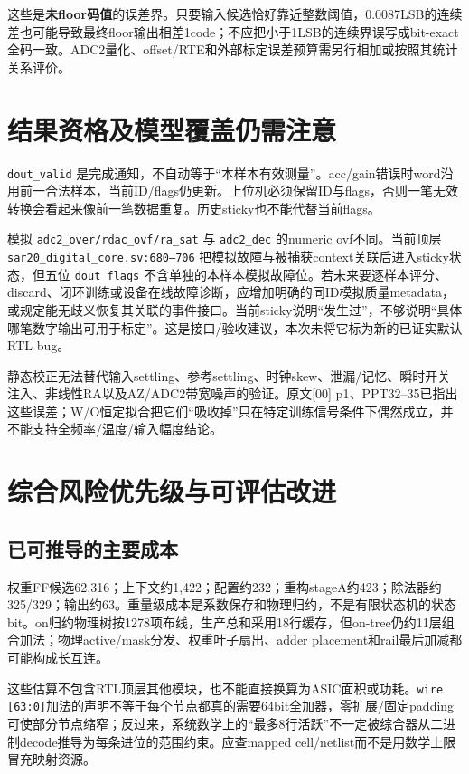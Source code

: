 \documentclass[UTF8,fontset=fandol,10pt,a4paper,openany]{ctexrep}
\newcommand{\code}[1]{\nolinkurl{#1}}
\begin{document}
这些是\textbf{未floor码值}的误差界。只要输入候选恰好靠近整数阈值，0.0087LSB的连续差也可能导致最终floor输出相差1code；不应把小于1LSB的连续界误写成bit-exact全码一致。ADC2量化、offset/RTE和外部标定误差预算需另行相加或按照其统计关系评价。


\section{结果资格及模型覆盖仍需注意}


\code{dout_valid} 是完成通知，不自动等于“本样本有效测量”。acc/gain错误时word沿用前一合法样本，当前ID/flags仍更新。上位机必须保留ID与flags，否则一笔无效转换会看起来像前一笔数据重复。历史sticky也不能代替当前flags。


模拟 \code{adc2_over/rdac_ovf/ra_sat} 与 \code{adc2_dec} 的numeric ovf不同。当前顶层 \code{sar20_digital_core.sv:680–706} 把模拟故障与被捕获context关联后进入sticky状态，但五位 \code{dout_flags} 不含单独的本样本模拟故障位。若未来要逐样本评分、discard、闭环训练或设备在线故障诊断，应增加明确的同ID模拟质量metadata，或规定能无歧义恢复其关联的事件接口。当前sticky说明“发生过”，不够说明“具体哪笔数字输出可用于标定”。这是接口/验收建议，本次未将它标为新的已证实默认RTL bug。


静态校正无法替代输入settling、参考settling、时钟skew、泄漏/记忆、瞬时开关注入、非线性RA以及AZ/ADC2带宽噪声的验证。原文[00] p1、PPT32–35已指出这些误差；W/O恒定拟合把它们“吸收掉”只在特定训练信号条件下偶然成立，并不能支持全频率/温度/输入幅度结论。


\section{综合风险优先级与可评估改进}


\subsection{已可推导的主要成本}


权重FF候选62,316；上下文约1,422；配置约232；重构stageA约423；除法器约325/329；输出约63。重量级成本是系数保存和物理归约，不是有限状态机的状态bit。on归约物理树按1278项布线，生产总和采用18行缓存，但on-tree仍约11层组合加法；物理active/mask分发、权重叶子扇出、adder placement和rail最后加减都可能构成长互连。


这些估算不包含RTL顶层其他模块，也不能直接换算为ASIC面积或功耗。\code{wire [63:0]}加法的声明不等于每个节点都真的需要64bit全加器，零扩展/固定padding可使部分节点缩窄；反过来，系统数学上的“最多8行活跃”不一定被综合器从二进制decode推导为每条进位的范围约束。应查mapped cell/netlist而不是用数学上限冒充映射资源。
\end{document}
